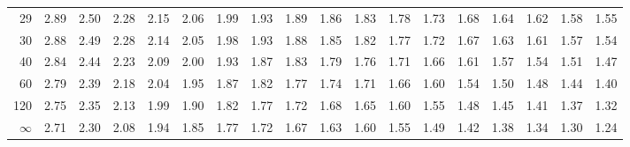 \begin{mvtable}
{{\begin{tabular}{r|*{17}{r}}
29 & 2.89 & 2.50 & 2.28 & 2.15 & 2.06 & 1.99 & 1.93 & 1.89 & 1.86 & 1.83 & 1.78 & 1.73 & 1.68 & 1.64 & 1.62 & 1.58 & 1.55\\
30 & 2.88 & 2.49 & 2.28 & 2.14 & 2.05 & 1.98 & 1.93 & 1.88 & 1.85 & 1.82 & 1.77 & 1.72 & 1.67 & 1.63 & 1.61 & 1.57 & 1.54\\
40 & 2.84 & 2.44 & 2.23 & 2.09 & 2.00 & 1.93 & 1.87 & 1.83 & 1.79 & 1.76 & 1.71 & 1.66 & 1.61 & 1.57 & 1.54 & 1.51 & 1.47\\
60 & 2.79 & 2.39 & 2.18 & 2.04 & 1.95 & 1.87 & 1.82 & 1.77 & 1.74 & 1.71 & 1.66 & 1.60 & 1.54 & 1.50 & 1.48 & 1.44 & 1.40\\
120 & 2.75 & 2.35 & 2.13 & 1.99 & 1.90 & 1.82 & 1.77 & 1.72 & 1.68 & 1.65 & 1.60 & 1.55 & 1.48 & 1.45 & 1.41 & 1.37 & 1.32\\
$\infty$ & 2.71 & 2.30 & 2.08 & 1.94 & 1.85 & 1.77 & 1.72 & 1.67 & 1.63 & 1.60 & 1.55 & 1.49 & 1.42 & 1.38 & 1.34 & 1.30 & 1.24\\
\bottomrule
\end{tabular}
}}
\end{mvtable}
